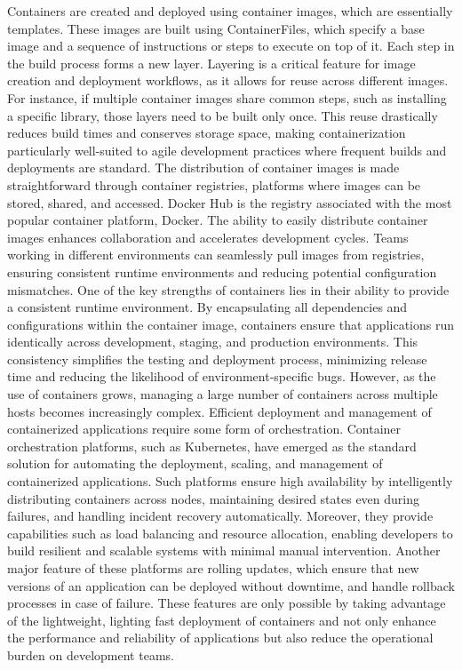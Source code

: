 Containers are created and deployed using container images, which are essentially templates. These images are built using ContainerFiles, which specify a base image and a sequence of instructions or steps to execute on top of it. Each step in the build process forms a new layer. Layering is a critical feature for image creation and deployment workflows, as it allows for reuse across different images. For instance, if multiple container images share common steps, such as installing a specific library, those layers need to be built only once. This reuse drastically reduces build times and conserves storage space, making containerization particularly well-suited to agile development practices where frequent builds and deployments are standard. The distribution of container images is made straightforward through container registries, platforms where images can be stored, shared, and accessed. Docker Hub is the registry associated with the most popular container platform, Docker. The ability to easily distribute container images enhances collaboration and accelerates development cycles. Teams working in different environments can seamlessly pull images from registries, ensuring consistent runtime environments and reducing potential configuration mismatches. One of the key strengths of containers lies in their ability to provide a consistent runtime environment. By encapsulating all dependencies and configurations within the container image, containers ensure that applications run identically across development, staging, and production environments. This consistency simplifies the testing and deployment process, minimizing release time and reducing the likelihood of environment-specific bugs. However, as the use of containers grows, managing a large number of containers across multiple hosts becomes increasingly complex. Efficient deployment and management of containerized applications require some form of orchestration. Container orchestration platforms, such as Kubernetes, have emerged as the standard solution for automating the deployment, scaling, and management of containerized applications\cite{dockerDev}. Such platforms ensure high availability by intelligently distributing containers across nodes, maintaining desired states even during failures, and handling incident recovery automatically. Moreover, they provide capabilities such as load balancing and resource allocation, enabling developers to build resilient and scalable systems with minimal manual intervention. Another major feature of these platforms are rolling updates, which ensure that new versions of an application can be deployed without downtime, and handle rollback processes in case of failure. These features are only possible by taking advantage of the lightweight, lighting fast deployment of containers and not only enhance the performance and reliability of applications but also reduce the operational burden on development teams.

